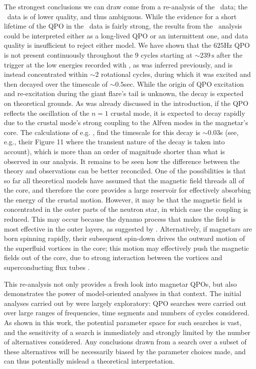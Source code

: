 \documentclass{emulateapj}
\begin{document}
The strongest conclusions we can draw come from a re-analysis of the \rxte\ data; the \rhessi\ data is of lower quality, and thus ambiguous. While the evidence for a short lifetime of the QPO in the \rxte\ data is fairly strong, the results from the \rhessi\ analysis could be interpreted either as a long-lived QPO or an intermittent one, and data quality is insufficient to reject either model.
 We have shown that the $625$Hz QPO is not present continuously throughout the $9$ cycles starting at $\sim\!\! 239 \, \mathrm{s}$ after the trigger at the low energies recorded with \rxte, as was inferred previously, and is instead concentrated within $\sim\!\! 2$ rotational cycles, during which it was excited and then decayed over the timescale
of $\sim\!\! 0.5$sec. While the origin of QPO excitation and re-excitation during the giant flare's tail is unknown, the
decay is expected on theoretical grounds. As was already discussed in the introduction, if the QPO reflects the oscillation of the $n=1$ crustal mode, it is expected to decay rapidly due to the crustal mode's strong coupling to the Alfven modes
in the magnetar's core. The calculations of e.g. \citet{vanHoven12}, find the timescale for this decay is $\sim\!\! 0.03$s (see, e.g., their Figure 11 where the transient nature of the decay is taken into account), which is more than an order of magnitude shorter than what is observed in our analysis. It remains to be seen how the difference between the theory and observations can be better reconciled. One of the possibilities is that so far 
all theoretical models have assumed that the magnetic field threads all of the core, and therefore the core provides a large reservoir for effectively absorbing the energy of the crustal motion. However, it may be that the magnetic field is concentrated in the outer parts of the neutron star, in which case the coupling is reduced. This may occur because the dynamo process that makes the field is most effective in
the outer layers, as suggested by \citet{bonanno2006}. Alternatively, if magnetars are born spinning rapidly, their subsequent spin-down drives the outward motion of the superfluid vortices in the core; this motion may effectively push the magnetic fields out of the core, due to strong interaction between the vortices and superconducting flux tubes \citep{ruderman1998}.

This re-analysis not only provides a fresh look into magnetar QPOs, but also demonstrates the power of model-oriented analyses in that context. The initial analyses carried out by \citet{Israel05,Strohmayer05,Strohmayer06,Watts06} were largely exploratory: QPO searches were carried out over large ranges of frequencies, time segments and numbers of cycles considered. As shown in this work, the potential parameter space for such searches is vast, and the sensitivity of a search is immediately and strongly limited by the number of alternatives considered. Any conclusions drawn from a search over a subset of these alternatives will be necessarily biased by the parameter choices made, and can thus potentially mislead a theoretical interpretation.
\end{document}
